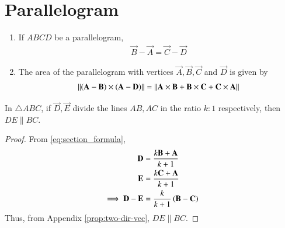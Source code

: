 \section{Parallelogram}
\begin{enumerate}[label=\thesection.\arabic*.,ref=\thesection.\theenumi]
  \item If $ABCD$ be a parallelogram,
	  \label{prop:two-pgm}
  \begin{align}
	  \label{eq:two-pgm}
 \vec{B}-\vec{A} = \vec{C} -\vec{D}
  \end{align}
\item The area of the parallelogram with vertices $\vec{A}, \vec{B}, \vec{C}$ and $\vec{D}$ is given by 
  \label{prop:pgm2d}
\begin{align}
  \label{eq:pgm2d}
	\left\lVert\left(\mathbf{A}-\mathbf{B}\right) \times \left(\mathbf{A}-\mathbf{D}\right)\right\rVert
 = 
 \left\lVert\mathbf{A} \times \mathbf{B}+\mathbf{B} \times \mathbf{C}+\mathbf{C} \times \mathbf{A}\right\rVert
  \end{align}
\end{enumerate}
\fi
  \iffalse
  \item In $\triangle ABC$, if $\vec{D}, \vec{E}$ divide the lines $AB, AC$ in the ratio $k:1$ respectively,  then $DE \parallel BC$.
	  \label{prop:two-tri-bpt}
	  \begin{proof}
		  From 
	  \eqref{eq:section_formula}, 
  \begin{align}
	  \mathbf{D}&= \frac{k\mathbf{B}+ \mathbf{A}}{k+1}
	  \\
	  \mathbf{E}&= \frac{k\mathbf{C}+ \mathbf{A}}{k+1}
	  \\
	  \implies 
	  \mathbf{D}-	  \mathbf{E}&= \frac{k}{k+1}\left(\mathbf{B}- \mathbf{C}\right)
  \end{align}
  Thus, from 
		  Appendix \ref{prop:two-dir-vec}, $DE \parallel BC$.

	  \end{proof}


